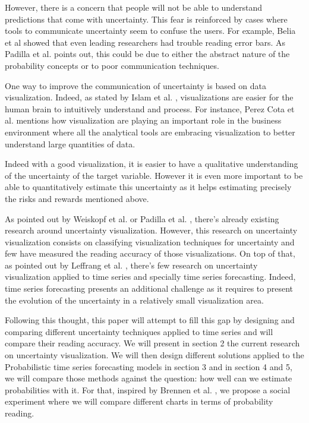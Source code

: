 \documentclass[a4paper,3p,sort&compress]{elsarticle}
\begin{document}
However, there is a concern that people will not be able to understand predictions that come with uncertainty.
This fear is reinforced by cases where tools to communicate uncertainty seem to confuse the users. For example,
Belia et al \cite{belia_researchers_2005} showed that even leading researchers had 
trouble reading error bars. 
As Padilla et al. \cite{padilla_uncertainty_2021} 
points out, this could be due to either the abstract nature of the probability concepts or to poor communication techniques.

One way to improve the communication of uncertainty is based on data visualization. Indeed, as 
stated by Islam et al. \cite{islam_overview_2019}, visualizations are easier for the human brain to intuitively understand and process.
For instance, Perez Cota et al. \cite{cota_importance_2014} mentions how visualization are playing an important role in the business 
environment where all the analytical tools are embracing visualization to better understand large quantities of data. 

Indeed with a good visualization, it is easier to have a qualitative understanding of the uncertainty of the target variable. 
However it is even more important to be able to quantitatively estimate this uncertainty as it helps estimating precisely 
the risks and rewards mentioned above. 

As pointed out by Weiskopf et al. \cite{weiskopf_uncertainty_2022} or Padilla et al. \cite{padilla_uncertainty_2021}, 
there's already existing research around uncertainty visualization. However, this research on uncertainty visualization consists on 
classifying visualization techniques for uncertainty and few have measured the reading accuracy of those visualizations.
On top of that, as pointed out by Leffrang et al. \cite{leffrang_should_2021}, 
there's few research on uncertainty visualization applied to time series 
and specially time series forecasting. Indeed, time series forecasting presents an additional challenge as it requires to present 
the evolution of the uncertainty in a relatively small visualization area.

Following this thought, this paper will attempt to fill this gap by designing and comparing different uncertainty techniques 
applied to time series and will compare their reading accuracy. We will present in section 2 the current research on uncertainty 
visualization. We will then
design different solutions applied to the Probabilistic time series forecasting models in section 3 and in section 4 and 5,
we will compare those methods against the question: how well can we estimate probabilities with it. 
For that, inspired by Brennen et al. \cite{brennen_instrument_2018}, we propose a social experiment where we will compare different charts 
in terms of probability reading. 
\end{document}
